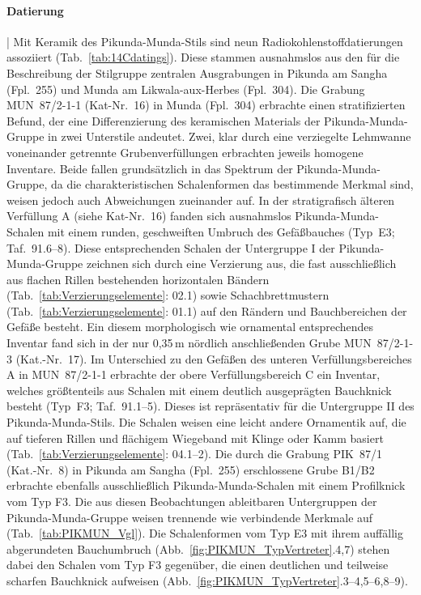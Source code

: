 \paragraph{Datierung}\hspace{-.5em}|\hspace{.5em}%
Mit Keramik des Pikunda-Munda-Stils sind neun Radiokohlenstoffdatierungen assoziiert (Tab.~\ref{tab:14Cdatings}). Diese stammen ausnahmslos aus den für die Beschreibung der Stilgruppe zentralen Ausgrabungen in Pikunda am \mbox{Sangha} (Fpl.~255) und Munda am \mbox{Likwala}-\mbox{aux}-\mbox{Herbes} (Fpl.~304). Die Grabung MUN~87/2-1-1 (Kat-Nr.~16) in Munda (Fpl.~304) erbrachte einen stratifizierten Befund, der eine Differenzierung des keramischen Materials der Pikunda-Munda-Gruppe in zwei Unterstile andeutet. Zwei, klar durch eine verziegelte Lehmwanne voneinander getrennte Grubenverfüllungen erbrachten jeweils homogene Inventare. Beide fallen grundsätzlich in das Spektrum der Pikunda-Munda-Gruppe, da die charakteristischen Schalenformen das bestimmende Merkmal sind, weisen jedoch auch Abweichungen zueinander auf. In der stratigrafisch älteren Verfüllung A (siehe Kat-Nr.~16) fanden sich ausnahmslos Pikunda-Munda-Schalen mit einem runden, geschweiften Umbruch des Gefäßbauches (Typ~E3; Taf.~91.6--8). Diese entsprechenden Schalen der Untergruppe I der Pikunda-Munda-Gruppe zeichnen sich durch eine Verzierung aus, die fast ausschließlich aus flachen Rillen bestehenden horizontalen Bändern (Tab.~\ref{tab:Verzierungselemente}: 02.1) sowie Schachbrettmustern (Tab.~\ref{tab:Verzierungselemente}: 01.1) auf den Rändern und Bauchbereichen der Gefäße besteht. Ein diesem morphologisch wie ornamental entsprechendes Inventar fand sich in der nur 0,35\,m nördlich anschließenden Grube MUN~87/2-1-3 (Kat.-Nr.~17). Im Unterschied zu den Gefäßen des unteren Verfüllungsbereiches A in MUN~87/2-1-1 erbrachte der obere Verfüllungsbereich C ein Inventar, welches größtenteils aus Schalen mit einem deutlich ausgeprägten Bauchknick besteht (Typ~F3; Taf.~91.1--5). Dieses ist repräsentativ für die Untergruppe II des Pikunda-Munda-Stils. Die Schalen weisen eine leicht andere Ornamentik auf, die auf tieferen Rillen und flächigem Wiegeband mit Klinge oder Kamm basiert (Tab.~\ref{tab:Verzierungselemente}: 04.1--2). Die durch die Grabung PIK~87/1 (Kat.-Nr.~8) in Pikunda am \mbox{Sangha} (Fpl.~255) erschlossene Grube B1/B2 erbrachte ebenfalls ausschließlich Pikunda-Munda-Schalen mit einem Profilknick vom Typ F3. Die aus diesen Beobachtungen ableitbaren Untergruppen der Pikunda-Munda-Gruppe weisen trennende wie verbindende Merkmale auf (Tab.~\ref{tab:PIKMUN_Vgl}). Die Schalenformen vom Typ E3 mit ihrem auffällig abgerundeten Bauchumbruch (Abb.~\ref{fig:PIKMUN_TypVertreter}.4,7) stehen dabei den Schalen vom Typ F3 gegenüber, die einen deutlichen und teilweise scharfen Bauchknick aufweisen (Abb.~\ref{fig:PIKMUN_TypVertreter}.3--4,5--6,8--9).

